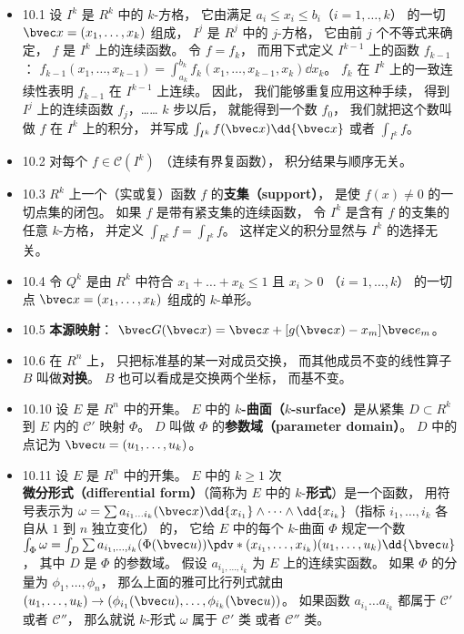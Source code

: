 \begin{itemize}
\item 10.1 设 $I^k$ 是 $R^k$ 中的 $k$-方格， 它由满足 $a_i\leqslant x_i \leqslant b_i$（$i=1,\dots,k$） 的一切 $\bvec x=(x_1,\dots,x_k)$ 组成， $I^j$ 是 $R^j$ 中的 $j$-方格， 它由前 $j$ 个不等式来确定， $f$ 是 $I^k$ 上的连续函数。 令 $f = f_k$， 而用下式定义 $I^{k-1}$ 上的函数 $f_{k-1}$： $f_{k-1}(x_1,\dots,x_{k-1}) = \int_{a_k}^{b_k} f_k(x_1,\dots,x_{k-1},x_k)\dd{x_k}$。 $f_k$ 在 $I^k$ 上的一致连续性表明 $f_{k-1}$ 在 $I^{k-1}$ 上连续。 因此， 我们能够重复应用这种手续， 得到 $I^j$ 上的连续函数 $f_j$，…… $k$ 步以后， 就能得到一个数 $f_0$， 我们就把这个数叫做 $f$ 在 $I^k$ 上的积分， 并写成 $\int_{I^k} f(\bvec x)\dd{\bvec x}$ 或者 $\int_{I^k} f$。

\item 10.2 对每个 $f\in \mathscr C(I^k)$ （连续有界复函数）， 积分结果与顺序无关。

\item 10.3 $R^k$ 上一个（实或复）函数 $f$ 的\textbf{支集（support）}， 是使 $f(x)\ne 0$ 的一切点集的闭包。 如果 $f$ 是带有紧支集的连续函数， 令 $I^k$ 是含有 $f$ 的支集的任意 $k$-方格， 并定义 $\int_{R^k}f = \int_{I^k}f$。 这样定义的积分显然与 $I^k$ 的选择无关。

\item 10.4 令 $Q^k$ 是由 $R^k$ 中符合 $x_1+\dots+x_k\leqslant 1$ 且 $x_i >0$ （$i=1,\dots,k$） 的一切点 $\bvec x=(x_1,\dots,x_k)$ 组成的 $k$-单形。 

\item 10.5 \textbf{本源映射}： $\bvec G(\bvec x) = \bvec x + [g(\bvec x)-x_m]\bvec e_m$。

\item 10.6 在 $R^n$ 上， 只把标准基的某一对成员交换， 而其他成员不变的线性算子 $B$ 叫做\textbf{对换}。 $B$ 也可以看成是交换两个坐标， 而基不变。

\item 10.10 设 $E$ 是 $R^n$ 中的开集。 $E$ 中的 \textbf{$k$-曲面（$k$-surface）}是从紧集 $D\subset R^k$ 到 $E$ 内的 $\mathscr C'$ 映射 $\Phi$。 $D$ 叫做 $\Phi$ 的\textbf{参数域（parameter domain）}。 $D$ 中的点记为 $\bvec u = (u_1,\dots, u_k)$。

\item 10.11 设 $E$ 是 $R^n$ 中的开集。 $E$ 中的 $k\geqslant 1$ 次\textbf{微分形式（differential form）}（简称为 $E$ 中的 $k$-\textbf{形式}）是一个函数， 用符号表示为 $\omega = \sum a_{i_1\dots i_k}(\bvec x)\dd{x_{i_1}} \wedge \dots \wedge \dd{x_{i_k}}$（指标 $i_1,\dots,i_k$ 各自从 $1$ 到 $n$ 独立变化） 的， 它给 $E$ 中的每个 $k$-曲面 $\Phi$ 规定一个数 $\int_\Phi \omega = \int_D \sum a_{i_1,\dots,i_k}(\Phi(\bvec u)) \pdv*{(x_{i_1},\dots,x_{i_k})}{(u_1,\dots,u_k)}\dd{\bvec u}$， 其中 $D$ 是 $\Phi$ 的参数域。 假设 $a_{i_1,\dots,i_k}$ 为 $E$ 上的连续实函数。 如果 $\Phi$ 的分量为 $\phi_1, \dots, \phi_n$， 那么上面的雅可比行列式就由 $(u_1,\dots,u_k)\to (\phi_{i_1}(\bvec u),\dots,\phi_{i_k}(\bvec u))$。 如果函数 $a_{i_1}\dots a_{i_k}$ 都属于 $\mathscr C'$ 或者 $\mathscr C''$， 那么就说 $k$-形式 $\omega$ 属于 $\mathscr C'$ 类 或者 $\mathscr C''$ 类。


\end{itemize}
